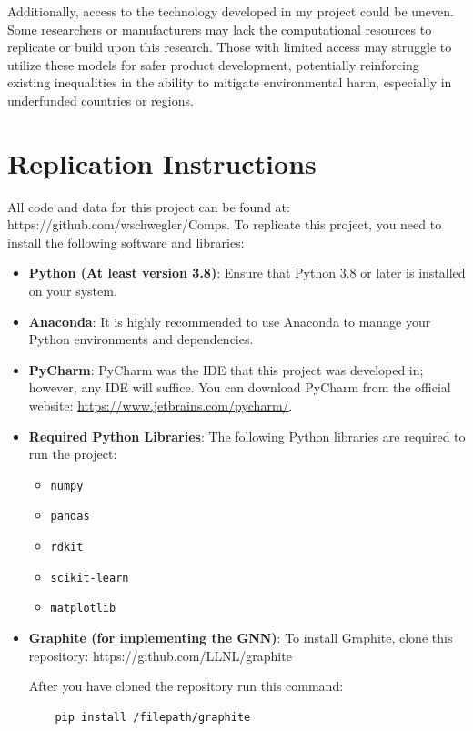 \documentclass[10pt,twocolumn]{article}
\begin{document}
Additionally, access to the technology developed in my project could be uneven. Some researchers or manufacturers may lack the computational resources to replicate or build upon this research. Those with limited access may struggle to utilize these models for safer product development, potentially reinforcing existing inequalities in the ability to mitigate environmental harm, especially in underfunded countries or regions.




\appendix
\section{Replication Instructions}

All code and data for this project can be found at: https://github.com/wschwegler/Comps. To replicate this project, you need to install the following software and libraries:

\begin{itemize}
    \item \textbf{Python (At least version 3.8)}: Ensure that Python 3.8 or later is installed on your system. 
    
    \item \textbf{Anaconda}: It is highly recommended to use Anaconda to manage your Python environments and dependencies. 
    
    \item \textbf{PyCharm}: PyCharm was the IDE that this project was developed in; however, any IDE will suffice. You can download PyCharm from the official website: \url{https://www.jetbrains.com/pycharm/}.
    
    \item \textbf{Required Python Libraries}: The following Python libraries are required to run the project:
    \begin{itemize}
        \item \texttt{numpy}
        \item \texttt{pandas}
        \item \texttt{rdkit}
        \item \texttt{scikit-learn}
        \item \texttt{matplotlib}
    \end{itemize}
    
    \item \textbf{Graphite (for implementing the GNN)}: To install Graphite, clone this repository: https://github.com/LLNL/graphite

    After you have cloned the repository run this command:
    \begin{verbatim}
    pip install /filepath/graphite
    \end{verbatim}
\end{itemize}
\end{document}
